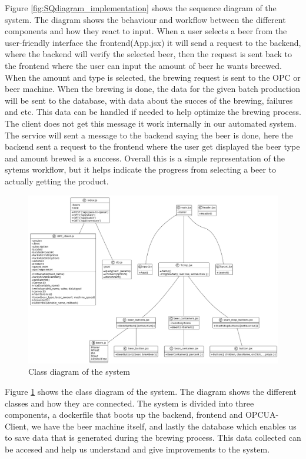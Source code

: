 Figure \ref{fig:SQdiagram_implementation} shows the sequence diagram of the system. The diagram shows the behaviour and workflow between the different components and how they react to input. When a user selects a beer from the user-friendly interface the frontend(App.jsx) it will send a request to the backend, where the backend will verify the selected beer, then the request is sent back to the frontend where the user can input the amount of beer he wants breewed. When the amount and type is selected, the brewing request is sent to the OPC or beer machine.
When the brewing is done, the data for the given batch production will be sent to the database, with data about the succes of the brewing, failures and etc. This data can be handled if needed to help optimize the brewing process. The client does not get this message it work internally in our automated system. The service will sent a message to the backend saying the beer is done, here the backend sent a request to the frontend where the user get displayed the beer type and amount brewed is a success.
Overall this is a simple representation of the sytems workflow, but it helps indicate the progress from selecting a beer to actually getting the product.


\begin{center}
    \centering
    \begin{figure}[H]
        \includegraphics[width=1\textwidth]{img/class_diagram.png}
        \caption{Class diagram of the system}
        \label{fig:class_diagram}
    \end{figure}
\end{center}
Figure \ref{fig:class_diagram} shows the class diagram of the system. The diagram shows the different classes and how they are connected. The system is divided into three components, a dockerfile that boots up the backend, frontend and OPCUA-Client, we have the beer machine itself, and lastly the database which enables us to save data that is generated during the brewing process. This data collected can be accesed and help us understand and give improvements to the system.

